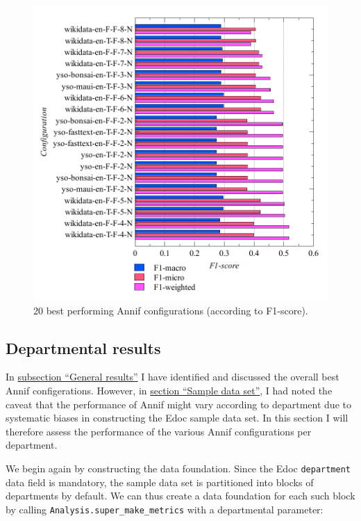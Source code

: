 \begin{figure}
\centering
\includegraphics{images/metrics_f1_top20.pdf}
\caption{20 best performing Annif configurations (according to
F1-score).}
\end{figure}

\hypertarget{departmental-results}{%
\subsection{Departmental results}\label{departmental-results}}

In \protect\hyperlink{general-results}{subsection ``General results''} I
have identified and discussed the overall best Annif configerations.
However, in \protect\hyperlink{sample-data-set}{section ``Sample data
set''}, I had noted the caveat that the performance of Annif might vary
according to department due to systematic biases in constructing the
Edoc sample data set. In this section I will therefore assess the
performance of the various Annif configurations per department.

We begin again by constructing the data foundation. Since the Edoc
\texttt{department} data field is mandatory, the sample data set is
partitioned into blocks of departments by default. We can thus create a
data foundation for each such block by calling
\texttt{Analysis.super\_make\_metrics} with a departmental parameter:

